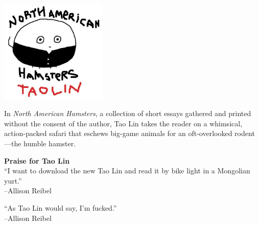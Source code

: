 \documentclass[10pt,twoside,openright]{memoir}
\begin{document}


\begin{vplace}
\begin{center}
  \includegraphics[width=2in]{img/cover}
\end{center}
\end{vplace}

\pagebreak


\begin{vplace}
\noindent
In {\em North American Hamsters}, a collection of short essays gathered and 
printed without the consent of the author, Tao Lin takes the reader on a
whimsical, action-packed safari that eschews big-game animals for an
oft-overlooked rodent---the humble hamster.

\begin{center}
\textbf{Praise for Tao Lin}
\\[1em]

``I want to download the new Tao Lin and read it by bike light in a Mongolian
yurt.''\\
--Allison Reibel

\vspace{1em}

``As Tao Lin would say, I'm fucked.'' \\
--Allison Reibel
\end{center}
\end{vplace}
\end{document}
